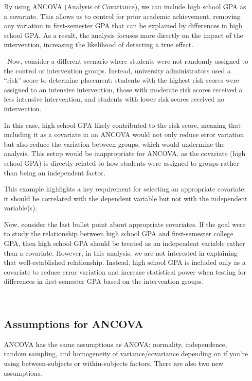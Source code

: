 \documentclass[
  letterpaper,
  DIV=11,
  numbers=noendperiod]{scrreprt}
\begin{document}
By using ANCOVA (Analysis of Covariance), we can include high school GPA
as a covariate. This allows us to control for prior academic
achievement, removing any variation in first-semester GPA that can be
explained by differences in high school GPA. As a result, the analysis
focuses more directly on the impact of the intervention, increasing the
likelihood of detecting a true effect.

\, Now, consider a different scenario where students were not randomly
assigned to the control or intervention groups. Instead, university
administrators used a ``risk'' score to determine placement: students
with the highest risk scores were assigned to an intensive intervention,
those with moderate risk scores received a less intensive intervention,
and students with lower risk scores received no intervention.

In this case, high school GPA likely contributed to the risk score,
meaning that including it as a covariate in an ANCOVA would not only
reduce error variation but also reduce the variation between groups,
which would undermine the analysis. This setup would be inappropriate
for ANCOVA, as the covariate (high school GPA) is directly related to
how students were assigned to groups rather than being an independent
factor.

This example highlights a key requirement for selecting an appropriate
covariate: it should be correlated with the dependent variable but not
with the independent variable(s).

Now, consider the last bullet point about appropriate covariates. If the
goal were to study the relationship between high school GPA and
first-semester college GPA, then high school GPA should be treated as an
independent variable rather than a covariate. However, in this analysis,
we are not interested in explaining that well-established relationship.
Instead, high school GPA is included only as a covariate to reduce error
variation and increase statistical power when testing for differences in
first-semester GPA based on the intervention groups.

\,

\subsection{Assumptions for ANCOVA}\label{assumptions-for-ancova}

ANCOVA has the same assumptions as ANOVA: normality, independence,
random sampling, and homogeneity of variance/covariance depending on if
you're using between-subjects or within-subjects factors. There are also
two new assumptions.\,\,
\end{document}
